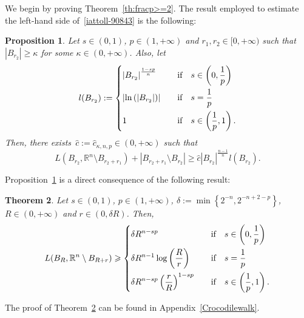 \documentclass[12pt]{article}
\newcommand{\R}{\mathbb{R}}
\numberwithin{equation}{section}
\newtheorem{thm}{Theorem}[section]
\newtheorem{prop}[thm]{Proposition}
\renewcommand{\geq}{\geqslant}
\begin{document}
We begin by proving Theorem~\ref{th:fracp>=2}. The result employed to estimate the left-hand side of~\eqref{iattoll-90843} is the following: 

\begin{prop}\label{keleetele}
Let $s\in(0,1)$, $p\in(1,+\infty)$ and $r_1,r_2\in [0,+\infty)$ such that  $\left|B_{r_2}\right|\geq \kappa$ for some $\kappa\in (0,+\infty)$. Also, let 
\begin{equation}\label{thedefofl}
l(B_{r_2}):=\begin{dcases}
\left|B_{r_2}\right|^{\frac{1-sp}{n}}\quad &\mbox{if}\quad s\in \left(0,\frac{1}{p}\right)\\
\left|\ln \left(\left|B_{r_2}\right|\right)\right|\quad &\mbox{if}\quad  s=\frac{1}{p}\\
1\quad &\mbox{if}\quad s\in \left(\frac{1}{p},1\right).
\end{dcases}
\end{equation}
Then, there exists~$\hat{c}:=\hat{c}_{\kappa,n,p}\in (0,+\infty)$  such  that  
\begin{equation}\label{Lrvcbopref}
L(B_{r_2},\R^n\setminus B_{r_2+r_1})+\left|B_{r_2+r_1}\setminus B_{r_2}\right|\geq \hat{c}\left|B_{r_2}\right|^{\frac{n-1}{n}}l(B_{r_2}).
\end{equation} 
\end{prop}
Proposition~\ref{keleetele} is a direct consequence of the following result:  
\begin{thm}\label{SymverofTh}
Let $s\in (0,1)$, $p\in (1,+\infty)$, $\delta:=\min\left\lbrace 2^{-n}, 2^{-n+2-p} \right\rbrace$, $R\in \left(0,+\infty\right)$ and $r\in \left(0,\delta R\right)$. Then, 
\begin{equation}\label{Sonounoskianto}
L(B_R,\R^n\setminus B_{R+r})\geq \begin{dcases} 
\delta R^{n-sp}\quad &\mbox{if}\quad
s\in \left(0,\frac{1}{p}\right)\\
\delta R^{n-1}\log\left(\frac{R}{r}\right)\quad &\mbox{if}\quad s=\frac{1}{p}\\
\delta R^{n-sp} \left(\frac{r}{R}\right)^{1-sp}\quad &\mbox{if}\quad s\in \left(\frac{1}{p},1\right).
\end{dcases}
\end{equation}
\end{thm}

The proof of Theorem~\ref{SymverofTh} can be found in Appendix~\ref{Crocodilewalk}. 
\end{document}
